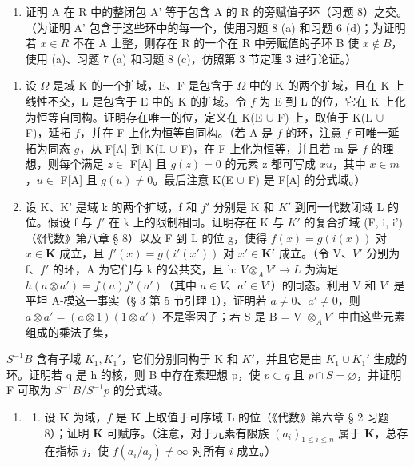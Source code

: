 \begin{enumerate}
\def\labelenumi{(\alph{enumi})}
\setcounter{enumi}{1}
\tightlist
\item
  证明 A 在 R 中的整闭包 A' 等于包含 A 的 R 的旁赋值子环（习题 8）之交。（为证明 A' 包含于这些环中的每一个，使用习题 8 (a) 和习题 6 (d)；为证明若 \(x \in R\) 不在 A 上整，则存在 R 的一个在 R 中旁赋值的子环 B 使 \(x \notin B\)，使用 (a)、习题 7 (a) 和习题 8 (c)，仿照第 3 节定理 3 进行论证。）
\end{enumerate}


\begin{enumerate}
\def\labelenumi{\arabic{enumi}.}
\item
  设 \(\Omega\) 是域 K 的一个扩域，E、F 是包含于 \(\Omega\) 中的 K 的两个扩域，且在 K 上线性不交，L 是包含于 E 中的 K 的扩域。令 \(f\) 为 E 到 L 的位，它在 K 上化为恒等自同构。证明存在唯一的位，定义在 K(E \(\cup\) F) 上，取值于 K(L \(\cup\) F)，延拓 \(f\)，并在 F 上化为恒等自同构。（若 A 是 \(f\) 的环，注意 \(f\) 可唯一延拓为同态 \(g\)，从 F{[}A{]} 到 K(L \(\cup\) F)，在 F 上化为恒等，并且若 m 是 \(f\) 的理想，则每个满足 \(z \in\) F{[}A{]} 且 \(g(z) = 0\) 的元素 z 都可写成 \(xu\)，其中 \(x \in m\)，\(u \in\) F{[}A{]} 且 \(g(u) \neq 0\)。最后注意 K(E \(\cup\) F) 是 F{[}A{]} 的分式域。）
\item
  设 K、K' 是域 k 的两个扩域，f 和 \(f'\) 分别是 K 和 \(K'\) 到同一代数闭域 L 的位。假设 f 与 \(f'\) 在 k 上的限制相同。证明存在 K 与 \(K'\) 的复合扩域 (F, i, i')（《代数》第八章 § 8）以及 F 到 L 的位 g，使得 \(f(x) = g(i(x))\) 对 \(x \in \mathbf{K}\) 成立，且 \(f'(x) = g(i'(x'))\) 对 \(x' \in \mathbf{K}'\) 成立。（令 V、\(V'\) 分别为 f、\(f'\) 的环，A 为它们与 k 的公共交，且 h: \(V \otimes_{A} V' \to L\) 为满足 \(h(a \otimes a') = f(a)f'(a')\)（其中 \(a \in V\)、\(a' \in V'\)）的同态。利用 V 和 \(V'\) 是平坦 A-模这一事实（§ 3 第 5 节引理 1），证明若 \(a \neq 0\)、\(a' \neq 0\)，则 \(a \otimes a' = (a \otimes 1)(1 \otimes a')\) 不是零因子；若 S 是 B = V \(\otimes_{A} V'\) 中由这些元素组成的乘法子集，
\end{enumerate}

\(S^{-1}B\) 含有子域 \(K_{1}, K_{1}'\)，它们分别同构于 K 和 \(K'\)，并且它是由 \(K_{1} \cup K_{1}'\) 生成的环。证明若 q 是 h 的核，则 B 中存在素理想 p，使 \(p \subset q\) 且 \(p \cap S = \varnothing\)，并证明 F 可取为 \(S^{-1}B/S^{-1}p\) 的分式域。

\begin{enumerate}
\def\labelenumi{\arabic{enumi}.}
\setcounter{enumi}{2}
\tightlist
\item
  \begin{enumerate}
  \def\labelenumii{(\alph{enumii})}
  \tightlist
  \item
    设 \(\mathbf{K}\) 为域，\(f\) 是 \(\mathbf{K}\) 上取值于可序域 \(\mathbf{L}\) 的位（《代数》第六章 § 2 习题 8）；证明 \(\mathbf{K}\) 可赋序。（注意，对于元素有限族 \((a_i)_{1\leq i\leq n}\) 属于 \(\mathbf{K}\)，总存在指标 \(j\)，使 \(f(a_i / a_j)\neq \infty\) 对所有 \(i\) 成立。）
  \end{enumerate}
\end{enumerate}

